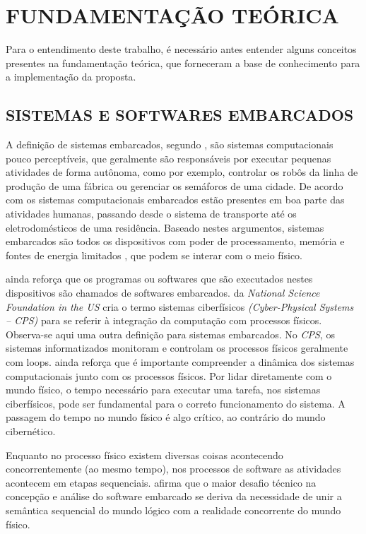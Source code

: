 \chapter{FUNDAMENTAÇÃO TEÓRICA}\label{CAP4}

Para o entendimento deste trabalho, é necessário antes entender alguns conceitos presentes na fundamentação teórica, que forneceram a base de conhecimento para a implementação da proposta.

\section{SISTEMAS E SOFTWARES EMBARCADOS}\label{secaosistemasembarcados}
A definição de sistemas embarcados, segundo , são sistemas computacionais pouco perceptíveis, que geralmente são responsáveis por executar pequenas atividades de forma autônoma, como por exemplo, controlar os robôs da linha de produção de uma fábrica ou gerenciar os semáforos de uma cidade. De acordo com  os sistemas computacionais embarcados estão presentes em boa parte das atividades humanas, passando desde o sistema de transporte até os eletrodomésticos de uma residência. Baseado nestes argumentos, sistemas embarcados são todos os dispositivos com poder de processamento, memória e fontes de energia limitados \cite{leeseshia}, que podem se interar com o meio físico.

 ainda reforça que os programas ou softwares que são executados nestes dispositivos são chamados de softwares embarcados.  da \textit{National Science Foundation in the US} cria o termo sistemas ciberfísicos \textit{(Cyber-Physical Systems – CPS)} para se referir à integração da computação com processos físicos. Observa-se aqui uma outra definição para sistemas embarcados. No \textit{CPS}, os sistemas informatizados monitoram e controlam os processos físicos geralmente com loops.  ainda reforça que é importante compreender a dinâmica dos sistemas computacionais junto com os processos físicos. Por lidar diretamente com o mundo físico, o tempo necessário para executar uma tarefa, nos sistemas ciberfísicos, pode ser fundamental para o correto funcionamento do sistema. A passagem do tempo no mundo físico é algo crítico, ao contrário do mundo cibernético.

Enquanto no processo físico existem diversas coisas acontecendo concorrentemente (ao mesmo tempo), nos processos de software as atividades acontecem em etapas sequenciais.  afirma que o maior desafio técnico na concepção e análise do software embarcado se deriva da necessidade de unir a semântica sequencial do mundo lógico com a realidade concorrente do mundo físico.

